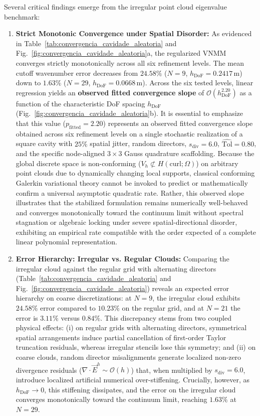 \documentclass[preprint,12pt]{elsarticle}
\begin{document}
Several critical findings emerge from the irregular point cloud eigenvalue benchmark:
\begin{enumerate}
    \item \textbf{Strict Monotonic Convergence under Spatial Disorder:} As evidenced in Table~\ref{tab:convergencia_cavidade_aleatoria} and Fig.~\ref{fig:convergencia_cavidade_aleatoria}a, the regularized VNMM converges strictly monotonically across all six refinement levels. The mean cutoff wavenumber error decreases from $24.58\%$ ($N = 9$, $h_{\mathrm{DoF}} = 0.2417$\,m) down to $1.63\%$ ($N = 29$, $h_{\mathrm{DoF}} = 0.0668$\,m). Across the six tested levels, linear regression yields an \textbf{observed fitted convergence slope} of $\mathcal{O}(h_{\mathrm{DoF}}^{2.20})$ as a function of the characteristic DoF spacing $h_{\mathrm{DoF}}$ (Fig.~\ref{fig:convergencia_cavidade_aleatoria}b). It is essential to emphasize that this value ($p_{\mathrm{fitted}} = 2.20$) represents an observed fitted convergence slope obtained across six refinement levels on a single stochastic realization of a square cavity with $25\%$ spatial jitter, random directors, $s_{\mathrm{div}} = 6.0$, $\widehat{\mathrm{Tol}} = 0.80$, and the specific node-aligned $3 \times 3$ Gauss quadrature scaffolding. Because the global discrete space is non-conforming ($V_h \not\subset H(\mathrm{curl}; \Omega)$) on arbitrary point clouds due to dynamically changing local supports, classical conforming Galerkin variational theory cannot be invoked to predict or mathematically confirm a universal asymptotic quadratic rate. Rather, this observed slope illustrates that the stabilized formulation remains numerically well-behaved and converges monotonically toward the continuum limit without spectral stagnation or algebraic locking under severe spatial-directional disorder, exhibiting an empirical rate compatible with the order expected of a complete linear polynomial representation.
    
    \item \textbf{Error Hierarchy: Irregular vs. Regular Clouds:} Comparing the irregular cloud against the regular grid with alternating directors (Table~\ref{tab:convergencia_cavidade_aleatoria} and Fig.~\ref{fig:convergencia_cavidade_aleatoria}) reveals an expected error hierarchy on coarse discretizations: at $N = 9$, the irregular cloud exhibits $24.58\%$ error compared to $10.23\%$ on the regular grid, and at $N = 21$ the error is $3.11\%$ versus $0.84\%$. This discrepancy stems from two coupled physical effects: (i) on regular grids with alternating directors, symmetrical spatial arrangements induce partial cancellation of first-order Taylor truncation residuals, whereas irregular stencils lose this symmetry; and (ii) on coarse clouds, random director misalignments generate localized non-zero divergence residuals ($\nabla \cdot \vec{E}^h \sim \mathcal{O}(h)$) that, when multiplied by $s_{\mathrm{div}} = 6.0$, introduce localized artificial numerical over-stiffening. Crucially, however, as $h_{\mathrm{DoF}} \to 0$, this stiffening dissipates, and the error on the irregular cloud converges monotonically toward the continuum limit, reaching $1.63\%$ at $N = 29$.
    

\end{enumerate}
\end{document}
